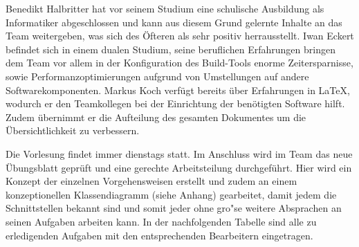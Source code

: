 Benedikt Halbritter hat vor seinem Studium eine schulische Ausbildung als Informatiker abgeschlossen und kann aus diesem Grund gelernte Inhalte an das Team weitergeben, was sich des \"Ofteren als sehr positiv herrausstellt.
Iwan Eckert befindet sich in einem dualen Studium, seine beruflichen Erfahrungen bringen dem Team vor allem in der Konfiguration des Build-Tools enorme Zeitersparnisse, sowie Performanzoptimierungen aufgrund von Umstellungen auf andere Softwarekomponenten.
Markus Koch verf\"ugt bereits \"uber Erfahrungen in \LaTeX, wodurch er den Teamkollegen bei der Einrichtung der ben\"otigten Software hilft.
Zudem \"ubernimmt er die Aufteilung des gesamten Dokumentes um die \"Ubersichtlichkeit zu verbessern.

Die Vorlesung findet immer dienstags statt.
Im Anschluss wird im Team das neue \"Ubungsblatt gepr\"uft und eine gerechte Arbeitsteilung durchgef\"uhrt.
Hier wird ein Konzept der einzelnen Vorgehensweisen erstellt und zudem an einem konzeptionellen Klassendiagramm (siehe Anhang) gearbeitet, damit jedem die Schnittstellen bekannt sind und somit jeder ohne gro"se weitere Absprachen an seinen Aufgaben arbeiten kann.
In der nachfolgenden Tabelle sind alle zu erledigenden Aufgaben mit den entsprechenden Bearbeitern eingetragen.


